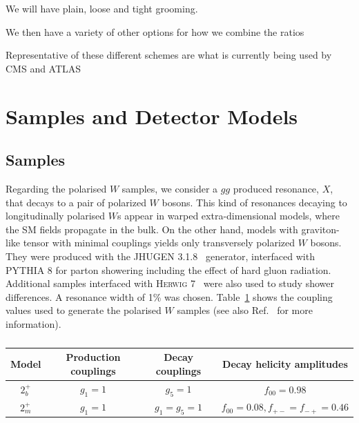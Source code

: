 \documentclass[11pt,letterpaper]{article}
\begin{document}
We will have plain, loose and tight grooming. 

We then have a variety of other options for how we combine the ratios


Representative of these different schemes are what is currently being used by CMS and ATLAS






\section{Samples and Detector Models}


\subsection{Samples}

Regarding the polarised $W$ samples, we consider a $gg$ produced resonance, $X$, that decays to a pair of polarized $W$ bosons. This kind of resonances decaying to longitudinally polarised $W$s appear in warped extra-dimensional models, where the SM fields propagate in the bulk. On the other hand, models with graviton-like tensor with minimal couplings yields only transversely polarized $W$ bosons. They were produced with the \textsc{JHUGEN} 3.1.8~\cite{Gao:2010qx,Bolognesi:2012mm} generator, interfaced with \textsc{PYTHIA} 8\cite{Sjostrand:2007gs} for parton showering including the effect of hard gluon radiation. Additional samples interfaced with \textsc{Herwig} 7~\cite{Bahr:2008pv,Bellm:2015jjp} were also used to study shower differences. A resonance width of 1\% was chosen. Table~\ref{table:polarisedSamples} shows the coupling values used to generate the polarised $W$ samples (see also Ref.~\cite{Gao:2010qx} for more information). 

\begin{table}[ht]
\caption{}
\centering
\begin{tabular}{c c c c}
\hline\hline
Model	&Production couplings	&Decay couplings	&Decay helicity amplitudes 	\\
\hline
$2_b^+$	& $g_1=1$		& $g_5=1$		& $f_{00}=0.98$			\\
$2_m^+$	& $g_1=1$		& $g_1=g_5=1$		& $f_{00}=0.08,f_{+-}=f_{-+}=0.46$\\	
\hline
\end{tabular}
\label{table:polarisedSamples}
\end{table}
\end{document}
